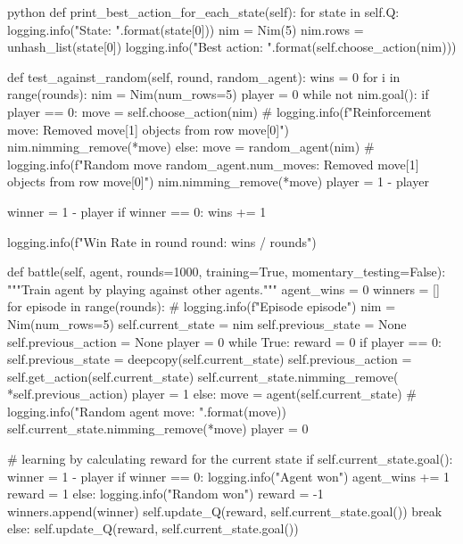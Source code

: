 \begin{mintedbox}{python}
def print_best_action_for_each_state(self):
    for state in self.Q:
        logging.info("State: {}".format(state[0]))
        nim = Nim(5)
        nim.rows = unhash_list(state[0])
        logging.info("Best action: {}".format(self.choose_action(nim)))

def test_against_random(self, round, random_agent):
    wins = 0
    for i in range(rounds):
        nim = Nim(num_rows=5)
        player = 0
        while not nim.goal():
            if player == 0:
                move = self.choose_action(nim)
                # logging.info(f"Reinforcement move: Removed {move[1]} objects from row {move[0]}")
                nim.nimming_remove(*move)
            else:
                move = random_agent(nim)
                # logging.info(f"Random move {random_agent.num_moves}: Removed {move[1]} objects from row {move[0]}")
                nim.nimming_remove(*move)
            player = 1 - player

        winner = 1 - player
        if winner == 0:
            wins += 1

    logging.info(f"Win Rate in round {round}: {wins / rounds}")

def battle(self, agent, rounds=1000, training=True, momentary_testing=False):
    """Train agent by playing against other agents."""
    agent_wins = 0
    winners = []
    for episode in range(rounds):
        # logging.info(f"Episode {episode}")
        nim = Nim(num_rows=5)
        self.current_state = nim
        self.previous_state = None
        self.previous_action = None
        player = 0
        while True:
            reward = 0
            if player == 0:
                self.previous_state = deepcopy(self.current_state)
                self.previous_action = self.get_action(self.current_state)
                self.current_state.nimming_remove(
                    *self.previous_action)
                player = 1
            else:
                move = agent(self.current_state)
                # logging.info("Random agent move: {}".format(move))
                self.current_state.nimming_remove(*move)
                player = 0

            # learning by calculating reward for the current state
            if self.current_state.goal():
                winner = 1 - player
                if winner == 0:
                    logging.info("Agent won")
                    agent_wins += 1
                    reward = 1
                else:
                    logging.info("Random won")
                    reward = -1
                winners.append(winner)
                self.update_Q(reward, self.current_state.goal())
                break
            else:
                self.update_Q(reward, self.current_state.goal())


\end{mintedbox}
